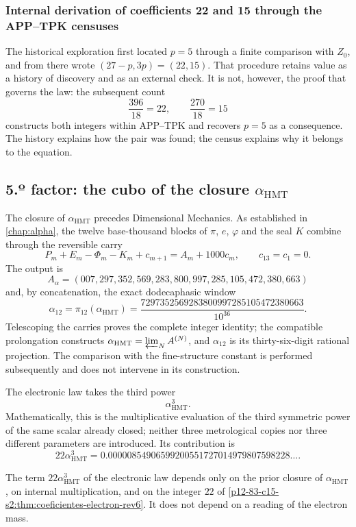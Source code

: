 \subsubsection{Internal derivation of coefficients 22 and 15 through the APP--TPK censuses}

The historical exploration first located \(p=5\) through a finite
comparison with \(Z_0\), and from there wrote
\((27-p,3p)=(22,15)\). That procedure retains value as a history of
discovery and as an external check. It is not, however, the proof
that governs the law: the subsequent count
\[
 \frac{396}{18}=22,
 \qquad
 \frac{270}{18}=15
\]
constructs both integers within APP--TPK and recovers \(p=5\) as a
consequence. The history explains how the pair was found; the census
explains why it belongs to the equation.

\subsection{5.º factor: the cubo of the closure \(\alpha_{\mathrm{HMT}}\)}

The closure of \(\alpha_{\mathrm{HMT}}\) precedes Dimensional Mechanics.
As established in \cref{chap:alpha}, the twelve base-thousand blocks
of \(\pi\), \(e\), \(\varphi\) and the seal \(K\) combine through the
reversible carry
\[
 P_m+E_m-\Phi_m-K_m+c_{m+1}
 =A_m+1000c_m,
 \qquad c_{13}=c_1=0.
\]
The output is
\[
 A_\alpha=
 (007,297,352,569,283,800,997,285,105,472,380,663)
\]
and, by concatenation, the exact dodecaphasic window
\[
 \alpha_{12}=\pi_{12}(\alpha_{\mathrm{HMT}})
 =
 \frac{
 7297352569283800997285105472380663
 }{10^{36}}.
\]
Telescoping the carries proves the complete integer identity; the
compatible prolongation constructs
\(\alpha_{\mathrm{HMT}}=\varprojlim_N A^{(N)}\), and \(\alpha_{12}\) is its
thirty-six-digit rational projection. The
comparison with the fine-structure constant is performed subsequently and does not
intervene in its construction.

The electronic law takes the third power
\[
 \alpha_{\mathrm{HMT}}^3.
\]
Mathematically, this is the multiplicative evaluation of the third
symmetric power of the same scalar already closed; neither three
metrological copies nor three different parameters are introduced. Its contribution is
\[
 22\alpha_{\mathrm{HMT}}^3
 =
 0.00000854906599200551727014979807598228\ldots.
\]

\begin{proposition}
\label{p12-83-c15-s2:prop:alpha-cubica-electron-rev6}
The term \(22\alpha_{\mathrm{HMT}}^3\) of the electronic law depends
only on the prior closure of \(\alpha_{\mathrm{HMT}}\), on internal
multiplication, and on the integer \(22\) of
\cref{p12-83-c15-s2:thm:coeficientes-electron-rev6}. It does not depend on a reading of the
electron mass.
\end{proposition}

